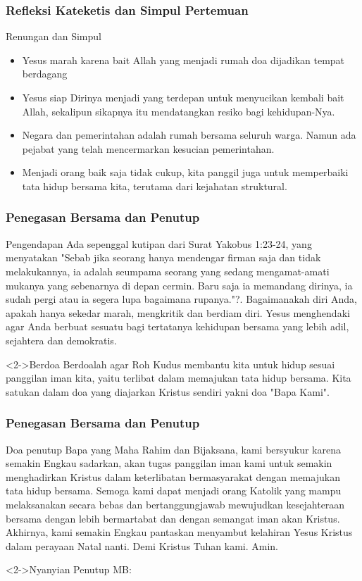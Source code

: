 \documentclass[11pt]{beamer}
\begin{document}
\begin{frame}
	\frametitle{Refleksi Kateketis dan Simpul Pertemuan}
	\begin{block}{Renungan dan Simpul}
	\begin{itemize}
		\item<1-> Yesus marah karena bait Allah yang menjadi rumah
		doa dijadikan tempat berdagang
		\item<2-> Yesus siap Dirinya menjadi yang terdepan untuk
		menyucikan kembali bait Allah, sekalipun sikapnya itu mendatangkan resiko bagi
		kehidupan-Nya.
		\item<3-> Negara dan pemerintahan adalah rumah bersama seluruh warga. Namun ada pejabat yang telah mencermarkan kesucian pemerintahan.
		\item<4-> Menjadi orang baik saja tidak cukup, kita
		panggil juga untuk memperbaiki tata hidup bersama kita, terutama dari kejahatan
		struktural.
	\end{itemize}
	\end{block}
\end{frame}

\begin{frame}
	\frametitle{Penegasan Bersama dan Penutup}
	\begin{block}{Pengendapan}
		Ada sepenggal kutipan dari Surat Yakobus 1:23-24, yang menyatakan "Sebab jika
		seorang hanya mendengar firman saja dan tidak melakukannya, ia adalah
		seumpama seorang yang sedang mengamat-amati mukanya yang sebenarnya di
		depan cermin. Baru saja ia memandang dirinya, ia sudah pergi atau ia segera lupa
		bagaimana rupanya."?. Bagaimanakah diri Anda, apakah hanya sekedar marah,
		mengkritik dan berdiam diri. Yesus menghendaki agar Anda berbuat sesuatu bagi
		tertatanya kehidupan bersama yang lebih adil, sejahtera dan demokratis.
	\end{block}
	\begin{block}<2->{Berdoa} \small
		Berdoalah agar Roh Kudus membantu kita untuk hidup sesuai panggilan iman kita,
		yaitu terlibat dalam memajukan tata hidup bersama. Kita satukan dalam doa yang
		diajarkan Kristus sendiri yakni doa "Bapa Kami".
	\end{block}
\end{frame}

\begin{frame}
	\frametitle{Penegasan Bersama dan Penutup}
	\begin{block}{Doa penutup}
		Bapa yang Maha Rahim dan Bijaksana, kami bersyukur karena semakin Engkau sadarkan,
		akan tugas panggilan iman kami untuk semakin menghadirkan Kristus dalam keterlibatan
		bermasyarakat dengan memajukan tata hidup bersama. Semoga kami dapat menjadi orang
		Katolik yang mampu melaksanakan secara bebas dan bertanggungjawab mewujudkan
		kesejahteraan bersama dengan lebih bermartabat dan dengan semangat iman akan Kristus.
		Akhirnya, kami semakin Engkau pantaskan menyambut kelahiran Yesus Kristus dalam
		perayaan Natal nanti. Demi Kristus Tuhan kami. Amin.
	\end{block}
	\begin{block}<2->{Nyanyian Penutup}
		MB:
	\end{block}
\end{frame}
\end{document}
